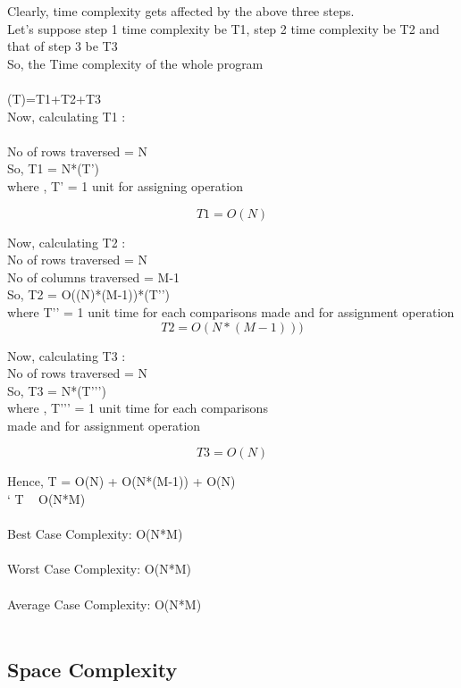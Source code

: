 \documentclass[conference]{IEEEtran}
\begin{document}
Clearly, time complexity gets affected by the above three steps.\\
Let's suppose step 1 time complexity be T1,  step 2 time complexity be T2 and that of step 3 be T3\\
So, the Time complexity of the whole program\\\\ (T)=T1+T2+T3\\

Now, calculating T1 :\\\\

No of rows traversed = N\\
So, T1 = N*(T’)\\
where , T’ = 1 unit for assigning operation

\[T1 = O(N)\]



 Now, calculating T2 :\\
No of rows traversed = N\\
No of columns traversed  = M-1\\
So, T2 = O((N)*(M-1))*(T’’)\\
where T’’ = 1 unit time for each comparisons made and for assignment operation
\[T2 = O(N*(M-1)))\]


Now, calculating T3 :\\
 No of rows traversed = N\\
 So, T3 = N*(T’’’)\\
        where , T’’’ = 1 unit time for each comparisons \\
                         made and for assignment operation
  
 
 \[T3 = O(N)\]

Hence, T = O(N) + O(N*(M-1)) + O(N)\\
`      T	 ~ O(N*M)\\\\

Best Case Complexity: O(N*M)\\\\

Worst Case Complexity: O(N*M)\\\\

Average Case Complexity:  O(N*M)\\\\

\subsection{Space Complexity}
\end{document}
